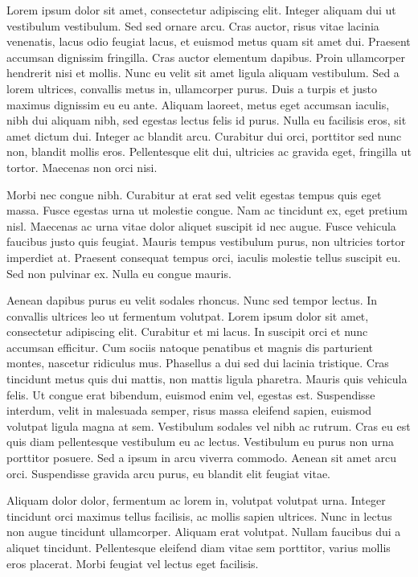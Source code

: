 Lorem ipsum dolor sit amet, consectetur adipiscing elit. Integer aliquam dui ut vestibulum vestibulum. Sed sed ornare arcu. Cras auctor, risus vitae lacinia venenatis, lacus odio feugiat lacus, et euismod metus quam sit amet dui. Praesent accumsan dignissim fringilla. Cras auctor elementum dapibus. Proin ullamcorper hendrerit nisi et mollis. Nunc eu velit sit amet ligula aliquam vestibulum. Sed a lorem ultrices, convallis metus in, ullamcorper purus. Duis a turpis et justo maximus dignissim eu eu ante. Aliquam laoreet, metus eget accumsan iaculis, nibh dui aliquam nibh, sed egestas lectus felis id purus. Nulla eu facilisis eros, sit amet dictum dui. Integer ac blandit arcu. Curabitur dui orci, porttitor sed nunc non, blandit mollis eros. Pellentesque elit dui, ultricies ac gravida eget, fringilla ut tortor. Maecenas non orci nisi.

Morbi nec congue nibh. Curabitur at erat sed velit egestas tempus quis eget massa. Fusce egestas urna ut molestie congue. Nam ac tincidunt ex, eget pretium nisl. Maecenas ac urna vitae dolor aliquet suscipit id nec augue. Fusce vehicula faucibus justo quis feugiat. Mauris tempus vestibulum purus, non ultricies tortor imperdiet at. Praesent consequat tempus orci, iaculis molestie tellus suscipit eu. Sed non pulvinar ex. Nulla eu congue mauris.

Aenean dapibus purus eu velit sodales rhoncus. Nunc sed tempor lectus. In convallis ultrices leo ut fermentum volutpat.
Lorem ipsum dolor sit amet, consectetur adipiscing elit. Curabitur et mi lacus. In suscipit orci et nunc accumsan efficitur. Cum sociis natoque penatibus et magnis dis parturient montes, nascetur ridiculus mus. Phasellus a dui sed dui lacinia tristique. Cras tincidunt metus quis dui mattis, non mattis ligula pharetra. Mauris quis vehicula felis. Ut congue erat bibendum, euismod enim vel, egestas est. Suspendisse interdum, velit in malesuada semper, risus massa eleifend sapien, euismod volutpat ligula magna at sem. Vestibulum sodales vel nibh ac rutrum. Cras eu est quis diam pellentesque vestibulum eu ac lectus. Vestibulum eu purus non urna porttitor posuere. Sed a ipsum in arcu viverra commodo. Aenean sit amet arcu orci. Suspendisse gravida arcu purus, eu blandit elit feugiat vitae.

Aliquam dolor dolor, fermentum ac lorem in, volutpat volutpat urna. Integer tincidunt orci maximus tellus facilisis, ac mollis sapien ultrices. Nunc in lectus non augue tincidunt ullamcorper. Aliquam erat volutpat. Nullam faucibus dui a aliquet tincidunt. Pellentesque eleifend diam vitae sem porttitor, varius mollis eros placerat. Morbi feugiat vel lectus eget facilisis.

